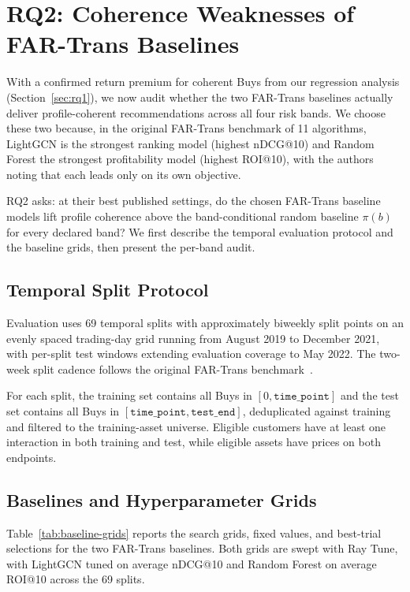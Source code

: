 \section{RQ2: Coherence Weaknesses of FAR-Trans Baselines}
\label{sec:rq2}

With a confirmed return premium for coherent Buys from our regression analysis (Section~\ref{sec:rq1}), we now audit whether the two FAR-Trans baselines actually deliver profile-coherent recommendations across all four risk bands. We choose these two because, in the original FAR-Trans benchmark of 11 algorithms, LightGCN is the strongest ranking model (highest nDCG@10) and Random Forest the strongest profitability model (highest ROI@10), with the authors noting that each leads only on its own objective.

RQ2 asks: at their best published settings, do the chosen FAR-Trans baseline models lift profile coherence above the band-conditional random baseline $\pi(b)$ for every declared band? We first describe the temporal evaluation protocol and the baseline grids, then present the per-band audit.

\subsection{Temporal Split Protocol}
\label{sec:setup:splits}

Evaluation uses 69 temporal splits with approximately biweekly split points on an evenly spaced trading-day grid running from August 2019 to December 2021, with per-split test windows extending evaluation coverage to May 2022. The two-week split cadence follows the original FAR-Trans benchmark~\cite{sanzcruzado2024fartransinvestmentdatasetfinancial}.

For each split, the training set contains all Buys in $[0, \texttt{time\_point}]$ and the test set contains all Buys in $[\texttt{time\_point}, \texttt{test\_end}]$, deduplicated against training and filtered to the training-asset universe. Eligible customers have at least one interaction in both training and test, while eligible assets have prices on both endpoints.

\subsection{Baselines and Hyperparameter Grids}
\label{sec:setup:baselines}

Table~\ref{tab:baseline-grids} reports the search grids, fixed values, and best-trial selections for the two FAR-Trans baselines. Both grids are swept with Ray Tune, with LightGCN tuned on average nDCG@10 and Random Forest on average ROI@10 across the 69 splits.

